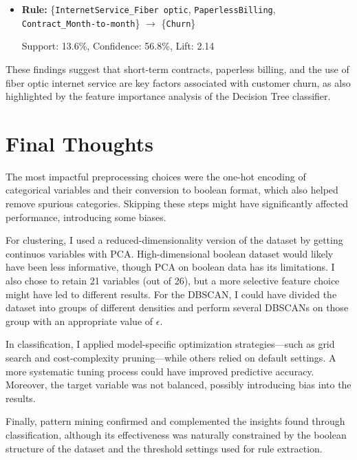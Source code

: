 \documentclass[a4paper,11pt]{article}
\begin{document}
\begin{itemize}
\item \textbf{Rule:} \{\texttt{InternetService\_Fiber optic}, \texttt{PaperlessBilling}, \texttt{Contract\_Month-to-month}\} $\rightarrow$ \{\texttt{Churn}\}

Support: 13.6\%, Confidence: 56.8\%, Lift: 2.14
\end{itemize}

These findings suggest that short-term contracts, paperless billing, and the use of fiber optic internet service are key factors associated with customer churn, as also highlighted by the feature importance analysis of the Decision Tree classifier.

\section{Final Thoughts}
The most impactful preprocessing choices were the one-hot encoding of categorical variables and their conversion to boolean format, which also helped remove spurious categories. Skipping these steps might have significantly affected performance, introducing some biases.

For clustering, I used a reduced-dimensionality version of the dataset by getting continuos variables with PCA. High-dimensional boolean dataset would likely have been less informative, though PCA on boolean data has its limitations. I also chose to retain 21 variables (out of 26), but a more selective feature choice might have led to different results. For the DBSCAN, I could have divided the dataset into groups of different densities and perform several DBSCANs on those group with an appropriate value of $\epsilon$.

In classification, I applied model-specific optimization strategies—such as grid search and cost-complexity pruning—while others relied on default settings. A more systematic tuning process could have improved predictive accuracy. Moreover, the target variable was not balanced, possibly introducing bias into the results.

Finally, pattern mining confirmed and complemented the insights found through classification, although its effectiveness was naturally constrained by the boolean structure of the dataset and the threshold settings used for rule extraction.
\end{document}
